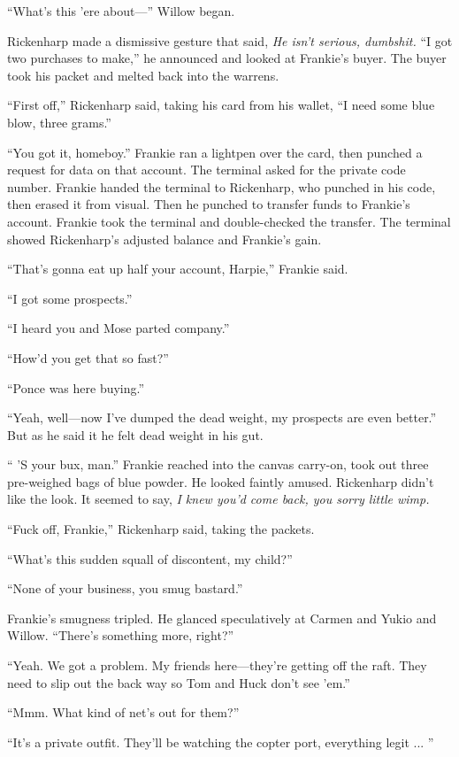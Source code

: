 ``What's this 'ere about---'' Willow began.

Rickenharp made a dismissive gesture that said, \textit{He isn't serious, dumbshit.} ``I got two purchases to make,'' he announced and looked at Frankie's buyer. The buyer took his packet and melted back into the warrens.

``First off,'' Rickenharp said, taking his card from his wallet, ``I need some blue blow, three grams.''

``You got it, homeboy.'' Frankie ran a lightpen over the card, then punched a request for data on that account. The terminal asked for the private code number. Frankie handed the terminal to Rickenharp, who punched in his code, then erased it from visual. Then he punched to transfer funds to Frankie's account. Frankie took the terminal and double-checked the transfer. The terminal showed Rickenharp's adjusted balance and Frankie's gain.

``That's gonna eat up half your account, Harpie,'' Frankie said.

``I got some prospects.''

``I heard you and Mose parted company.''

``How'd you get that so fast?''

``Ponce was here buying.''

``Yeah, well---now I've dumped the dead weight, my prospects are even better.'' But as he said it he felt dead weight in his gut.

`` 'S your bux, man.'' Frankie reached into the canvas carry-on, took out three pre-weighed bags of blue powder. He looked faintly amused. Rickenharp didn't like the look. It seemed to say, \textit{I knew you'd come back, you sorry little wimp.}

``Fuck off, Frankie,'' Rickenharp said, taking the packets.

``What's this sudden squall of discontent, my child?''

``None of your business, you smug bastard.''

Frankie's smugness tripled. He glanced speculatively at Carmen and Yukio and Willow. ``There's something more, right?''

``Yeah. We got a problem. My friends here---they're getting off the raft. They need to slip out the back way so Tom and Huck don't see 'em.''

``Mmm. What kind of net's out for them?''

``It's a private outfit. They'll be watching the copter port, everything legit ... ''

